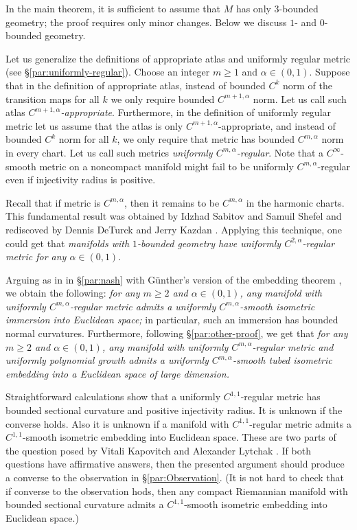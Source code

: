 \arxiv{\documentclass[a4paper,10pt]{article}}{\documentclass{mjm}}
\begin{document}
In the main theorem, it is sufficient to assume that $M$ has only $3$-bounded geometry;
the proof requires only minor changes.
Below we discuss $1$- and $0$-bounded geometry.

Let us generalize the definitions of appropriate atlas and uniformly regular metric (see §\ref{par:uniformly-regular}).
Choose an integer $m\ge 1$ and $\alpha\in(0,1)$.
Suppose that in the definition of appropriate atlas,
instead of bounded $C^k$ norm of the transition maps for all $k$ 
we only require bounded $C^{m+1,\alpha}$ norm.
Let us call such atlas \emph{$C^{m+1,\alpha}$-appropriate}.
Furthermore, in the definition of uniformly regular metric let us assume that the atlas is only $C^{m+1,\alpha}$-appropriate, and instead of bounded $C^k$ norm for all $k$,
we only require that metric has bounded $C^{m,\alpha}$ norm in every chart.
Let us call such metrics \emph{uniformly $C^{m,\alpha}$-regular}.
Note that a $C^\infty$-smooth metric on a noncompact manifold might fail to be uniformly $C^{m,\alpha}$-regular even if injectivity radius is positive.

Recall that if metric is $C^{m,\alpha}$, then it remains to be $C^{m,\alpha}$ in the harmonic charts.
This fundamental result was obtained by Idzhad Sabitov and Samuil Shefel \cite{sabitov-shefel} and rediscoved by Dennis DeTurck and Jerry Kazdan \cite{deturck-kazdan}.
Applying this technique, one could get that \textit{manifolds with $1$-bounded geometry have uniformly $C^{2,\alpha}$-regular metric for any $\alpha\in (0,1)$}.

Arguing as in in §\ref{par:nash} with Günther's version of the embedding theorem \cite{guenther},
we obtain the following: \textit{for any $m\ge 2$ and $\alpha\in(0,1)$, any manifold with uniformly $C^{m,\alpha}$-regular metric admits a uniformly $C^{m,\alpha}$-smooth isometric immersion into Euclidean space;}
in particular, such an immersion has bounded normal curvatures.
Furthermore, following §\ref{par:other-proof}, we get that
\textit{for any $m\ge 2$ and $\alpha\in(0,1)$, any manifold with uniformly $C^{m,\alpha}$-regular metric and uniformly polynomial growth admits a uniformly $C^{m,\alpha}$-smooth tubed isometric embedding into a Euclidean space of large dimension.}

Straightforward calculations show that a uniformly $C^{1,1}$-regular metric has bounded sectional curvature and positive injectivity radius.
It is unknown if the converse holds.
Also it is unknown if a manifold with $C^{1,1}$-regular metric admits a $C^{1,1}$-smooth isometric embedding into Euclidean space.
These are two parts of the question posed by Vitali Kapovitch and Alexander Lytchak \cite[1.10]{kapovitch-lytchak}.
If both questions have affirmative answers, then the presented argument should produce a converse to the observation in §\ref{par:Observation}.
(It is not hard to check that if converse to the observation hods, then any compact Riemannian manifold with bounded sectional curvature admits a $C^{1,1}$-smooth isometric embedding into Euclidean space.)
\end{document}
